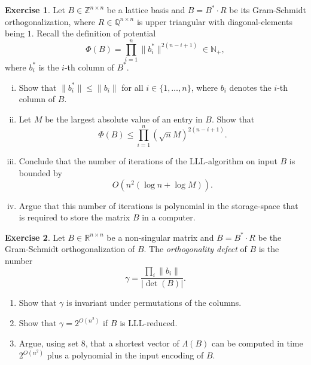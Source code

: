 \documentclass[12pt,a4paper]{article}
\theoremstyle{plain}
\newtheorem*{Sol*}{Solution}
\theoremstyle{definition}
\newtheorem{Ex}{Exercise}
\newif\ifsolutions
\newcommand{\exercise}[2]{
			\begin{Ex} #1 \end{Ex}
			\ifsolutions  \begin{Sol*} #2 \end{Sol*} \bigskip \else \bigskip  \fi
		}
\begin{document}
\exercise{
  Let $B ∈ ℤ^{ n ×n}$ be a lattice basis and $Β= B^* ⋅ R$ be its Gram-Schmidt orthogonalization, where $R ∈ ℚ^{n ×n}$ is upper triangular with diagonal-elements being $1$. Recall the definition of potential
  \begin{displaymath}
    Φ(B) = ∏_{i=1}^n \|b_i^*\|^{2 (n-i+1)} ∈ℕ_+, 
  \end{displaymath}
  where $b_i^*$ is the $i$-th column of $B^*$. 

  \begin{enumerate}[i)]   
  \item Show that $\|b_i^* \| ≤ \|b_i\|$ for all $i ∈ \{1,\dots,n\}$, where $b_i$ denotes the $i$-th column of $B$. 
  \item Let $M$ be the largest absolute value of an entry in $B$. Show that
    \begin{displaymath}
       Φ(B) \leq ∏_{i=1}^n (\sqrt{n} M)^{2 (n-i+1)}. 
     \end{displaymath}
   \item Conclude that the number of iterations of the LLL-algorithm on input $B$ is bounded by
     \begin{displaymath}
       O(n^2 (\log n + \log M)).       
     \end{displaymath}
   \item Argue that this number of iterations is polynomial in the storage-space that is required to store the matrix $B$ in a computer. 
  \end{enumerate}
}{}

\exercise{
  Let $Β∈ ℝ^{n ×n}$ be a non-singular matrix and $B = B^* ⋅ R$ be the Gram-Schmidt orthogonalization  of $B$. The \emph{orthogonality defect} of $B$ is the number
  \begin{displaymath}
    γ = \frac{∏_i \| b_i \|}{|\det(B)|}.  
  \end{displaymath}

  \begin{enumerate}
  \item Show that $γ$ is invariant under permutations of the columns. 
  \item Show that $γ = 2^{O(n^2)}$ if $B$ is LLL-reduced.
  \item  Argue, using set 8, that a shortest vector of $Λ(B)$ can be computed in time $2^{O(n^2)}$ plus  a polynomial in the input encoding of $B$. 
  \end{enumerate}
}{}
\end{document}
